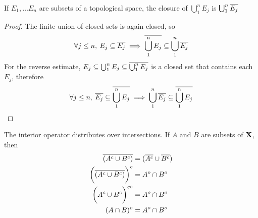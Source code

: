 \documentclass[../../main.tex]{subfiles}
\begin{document}
\begin{wts}
    If $E_1,\ldots E_n$ are subsets of a topological space, the closure of $\bigcup_1^n E_j$ is $\bigcup_1^n \overline{E_j}$
\end{wts}
\begin{proof}
    The finite union of closed sets is again closed, so 
    \[
        \forall j\leq n,\: E_j\subseteq \overline{E_j}\implies \overline{\bigcup_1^n E_j}\subseteq \bigcup_1^n \overline{E_j}
    \]
    For the reverse estimate, $E_j\subseteq\bigcup_1^n E_j\subseteq \overline{\bigcup_1^n E_j}$ is a closed set that contains each $E_j$, therefore
    \[
        \forall j\leq n,\: \overline{E_j}\subseteq \overline{\bigcup_1^n E_j}\implies \bigcup_1^n \overline{E_j}\subseteq \overline{\bigcup_1^n E_j}
    \]
\end{proof}
\begin{corollary}
    The interior operator distributes over intersections. If $A$ and $B$ are subsets of ${\mathbf{X}}$, then
    \begin{align*}
        \overline{(A^c\cup  B^c)} &= (\overline{A^c}\cup \overline{B^c})\\
        \biggl(\overline{(A^c\cup  B^c)}\biggr)^c&= A^o\cap B^o\\
        \biggl(A^c\cup B^c\biggr)^{co} &= A^o\cap B^o\\
        (A\cap B)^o&=A^o\cap B^o
    \end{align*}
\end{corollary}
\newpage
\end{document}
